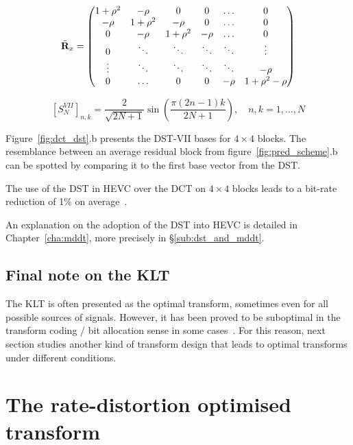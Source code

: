 \documentclass[11pt,a4paper,openright,twoside]{book}
\numberwithin{equation}{section} %
\numberwithin{figure}{section} %
\numberwithin{table}{section} %
\begin{document}
\begin{equation}
	\tilde{\mathbf{R}}_x =
	\begin{pmatrix}
		1+\rho^2 & -\rho    & 0        & 0      & \hdots & 0            \\
		-\rho    & 1+\rho^2 & -\rho    & 0      & \hdots & 0            \\
		0        & -\rho    & 1+\rho^2 & -\rho  & \hdots & 0            \\
		0        & \ddots   & \ddots   & \ddots & \ddots & \vdots       \\
		\vdots   & \ddots   & \ddots   & \ddots & \ddots & -\rho        \\
		0        & \hdots   & 0        & 0      & -\rho  & 1+\rho^2-\rho
	\end{pmatrix}
	\label{eqn:tridiagonal_matrix}
\end{equation}

\begin{equation}
	{\left[S_{N}^{VII} \right]}_{n,k} =
	\frac{2}{\sqrt{2N+1}}\sin\left(\frac{\pi(2n-1)k}{2N+1}\right),
	\quad
	n,k = 1, \dots, N
	\label{eqn:dst_vii}
\end{equation}

Figure~\ref{fig:dct_dst}.b presents the \ac{DST}-VII bases for
$4\times4$ blocks.
The resemblance between an average residual block from
figure~\ref{fig:pred_scheme}.b can be spotted by comparing it to the first
base vector from the \ac{DST}.

The use of the \ac{DST} in \ac{HEVC} over the \ac{DCT} on $4\times4$
blocks leads to a bit-rate reduction of 1\% on
average~\cite{sullivan-12-overview-hevc}.

An explanation on the adoption of the \ac{DST} into \ac{HEVC} is detailed in
Chapter~\ref{cha:mddt}, more precisely in \S\ref{sub:dst_and_mddt}.

\subsection{Final note on the \acs{KLT}}
\label{sub:final_note_on_the_klt}

The \ac{KLT} is often presented as the optimal transform, sometimes even for
all possible sources of signals.
However, it has been proved to be suboptimal in the transform coding / bit
allocation sense in some cases~\cite{effros-04-suboptimal-klt}.
For this reason, next section studies another kind of transform design that
leads to optimal transforms under different conditions.

\section{The rate-distortion optimised transform}
\label{sec:rdot}
\end{document}
